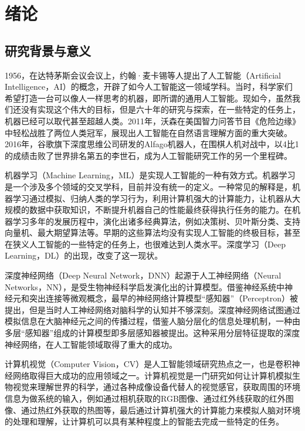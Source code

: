 \chapter{绪论}
\label{cha:introduction}

\section{研究背景与意义}
\label{sec:intro}

1956，在达特茅斯会议会议上，约翰·麦卡锡等人提出了人工智能（Artificial Intelligence，AI）的概念，开辟了如今人工智能这一领域学科。当时，科学家们希望打造一台可以像人一样思考的机器，即所谓的通用人工智能。现如今，虽然我们还没有实现这个伟大的目标，但是六十年的研究与探索，在一些特定的任务上，机器已经可以取代甚至超越人类。2011年，沃森在美国智力问答节目《危险边缘》中轻松战胜了两位人类冠军，展现出人工智能在自然语言理解方面的重大突破。2016年，谷歌旗下深度思维公司研发的Alfago机器人，在围棋人机对战中，以4比1的成绩击败了世界排名第五的李世石，成为人工智能研究工作的另一个里程碑。

机器学习（Machine Learning，ML）是实现人工智能的一种有效方式。机器学习是一个涉及多个领域的交叉学科，目前并没有统一的定义。一种常见的解释是，机器学习通过模拟、归纳人类的学习行为，利用计算机强大的计算能力，让机器从大规模的数据中获取知识，不断提升机器自己的性能最终获得执行任务的能力。在机器学习多年的发展历程中，演化出诸多经典算法，例如决策树、贝叶斯分类、支持向量机、最大期望算法等。早期的这些算法均没有实现人工智能的终极目标，甚至在狭义人工智能的一些特定的任务上，也很难达到人类水平。深度学习（Deep Learning，DL）的出现，改变了这一现状。

深度神经网络（Deep Neural Network，DNN）起源于人工神经网络（Neural Networks，NN），是受生物神经科学启发演化出的计算模型。借鉴神经系统中神经元和突出连接等微观概念，最早的神经网络计算模型“感知器”（Perceptron）被提出，但是当时人工神经网络对脑科学的认知并不够深刻。深度神经网络试图通过模拟信息在大脑神经元之间的传播过程，借鉴人脑分层化的信息处理机制，一种由多层“感知器”组成的计算模型即多层感知器被提出。这种采用分层特征提取的深度神经网络，在人工智能领域取得了重大的成功。

计算机视觉（Computer Vision，CV）是人工智能领域研究热点之一，也是卷积神经网络取得巨大成功的应用领域之一。计算机视觉是一门研究如何让计算机模拟生物视觉来理解世界的科学，通过各种成像设备代替人的视觉感官，获取周围的环境信息为做系统的输入，例如通过相机获取的RGB图像、通过红外线获取的红外图像、通过热红外获取的热图等，最后通过计算机强大的计算能力来模拟人脑对环境的处理和理解，让计算机可以具有某种程度上的智能去完成一些特定的任务。


